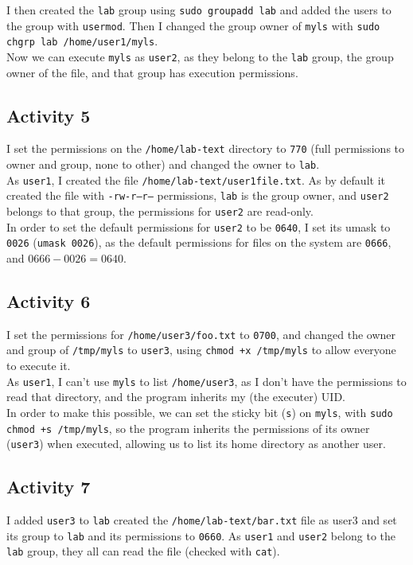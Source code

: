 I then created the \texttt{lab} group using \texttt{sudo groupadd lab} and added the users to the group with \texttt{usermod}. Then I changed the group owner of \texttt{myls} with \texttt{sudo chgrp lab /home/user1/myls}.\\
Now we can execute \texttt{myls} as \texttt{user2}, as they belong to the \texttt{lab} group, the group owner of the file, and that group has execution permissions.

\subsection*{Activity 5}
I set the permissions on the \texttt{/home/lab-text} directory to \texttt{770} (full permissions to owner and group, none to other) and changed the owner to \texttt{lab}.\\

As \texttt{user1}, I created the file \texttt{/home/lab-text/user1file.txt}. As by default it created the file with \texttt{-rw-r--r--} permissions, \texttt{lab} is the group owner, and \texttt{user2} belongs to that group, the permissions for \texttt{user2} are read-only.\\

In order to set the default permissions for \texttt{user2} to be \texttt{0640}, I set its umask to \texttt{0026} (\texttt{umask 0026}), as the default permissions for files on the system are \texttt{0666}, and $0666-0026=0640$.

\subsection*{Activity 6}
I set the permissions for \texttt{/home/user3/foo.txt} to \texttt{0700}, and changed the owner and group of \texttt{/tmp/myls} to \texttt{user3}, using \texttt{chmod +x /tmp/myls} to allow everyone to execute it.\\

As \texttt{user1}, I can't use \texttt{myls} to list \texttt{/home/user3}, as I don't have the permissions to read that directory, and the program inherits my (the executer) UID.\\

In order to make this possible, we can set the sticky bit (\texttt{s}) on \texttt{myls}, with \texttt{sudo chmod +s /tmp/myls}, so the program inherits the permissions of its owner (\texttt{user3}) when executed, allowing us to list its home directory as another user.

\subsection*{Activity 7}
I added \texttt{user3} to \texttt{lab} created the \texttt{/home/lab-text/bar.txt} file as user3 and set its group to \texttt{lab} and its permissions to \texttt{0660}. As \texttt{user1} and \texttt{user2} belong to the \texttt{lab} group, they all can read the file (checked with \texttt{cat}).\\


